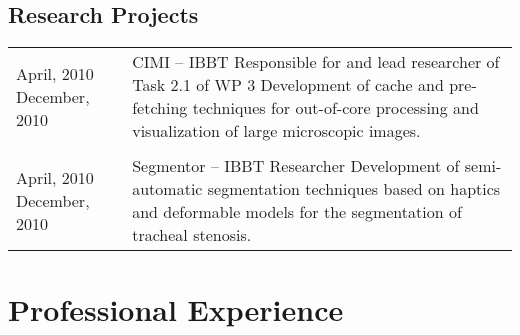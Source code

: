 \subsection{Research Projects}
\begin{tabular}{p{} p{}}
April, 2010 \newline December, 2010 & CIMI -- IBBT \newline 
Responsible for and lead researcher of Task 2.1 of WP 3 \newline
Development of cache and pre-fetching techniques for out-of-core processing and visualization of large microscopic images. \\
\\
April, 2010 \newline December, 2010 & Segmentor -- IBBT \newline
Researcher \newline
Development of semi-automatic segmentation techniques based on haptics and deformable models for the segmentation of tracheal stenosis.
\end{tabular}


\section{Professional Experience}

